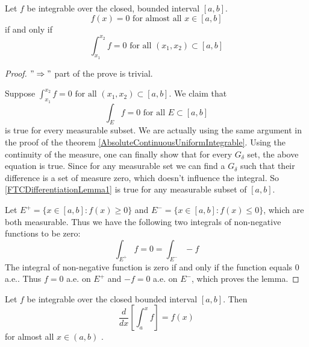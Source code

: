\documentclass[lang=en, 12pt]{elegantbook}
\begin{document}
            \begin{lemma}
                Let $f$ be integrable over the closed, bounded interval $[a,b]$. 
            $$f(x) = 0 \mbox{ for almost all } x \in [a,b]$$
            if and only if 
            $$\int_{x_1}^{x_2} f = 0 \mbox{ for all }(x_1,x_2) \subset [a,b]$$
            \end{lemma}
            \begin{proof}
                $"\Rightarrow"$ part of the prove is trivial. \par 
                Suppose $\int_{x_1}^{x_2} f = 0 \mbox{ for all }(x_1,x_2) \subset [a,b]$.
            We claim that  
            \begin{equation}\label{FTCDifferentiationLemma1}
                \int_E f = 0 \mbox{ for all }E \subset [a,b]
            \end{equation}
            is true for every measurable subset. We are actually using the 
            same argument in the proof of the 
            theorem \ref{AbsoluteContinuousUniformIntegrable}. Using 
            the continuity of the measure, one can finally show that for every
            $G_{\delta}$ set, the above equation is true. Since for any 
            measurable set we can find a $G_{\delta}$ such that their 
            difference is a set of measure zero, which doesn't influence 
            the integral. So \eqref{FTCDifferentiationLemma1} is true for 
            any measurable subset of $[a,b]$.\par
                Let $E^+ = \{x\in [a,b]: f(x) \geq 0\}$ and 
            $E^- = \{x \in [a,b]:f(x)\leq 0\}$, which are both 
            measurable. Thus we have the following two integrals of 
            non-negative functions to be zero:
            $$\int_{E^+} f = 0 = \int_{E^-} -f$$
                The integral of non-negative function is zero 
            if and only if the function equals $0$ a.e.. Thus 
            $f= 0$ a.e. on $E^+$ and $-f = 0$ a.e. on $E^-$, which 
            proves the lemma.
            \end{proof}
            \begin{theorem}
                Let $f$ be integrable over the closed bounded 
            interval $[a,b]$. Then
            \begin{equation}\label{FTCDifferentiation}
                \frac{d}{dx} \left[\int_a^x f\right] = f(x)
            \end{equation}
            for almost all $x \in (a,b)$ .
            \end{theorem}
\end{document}
